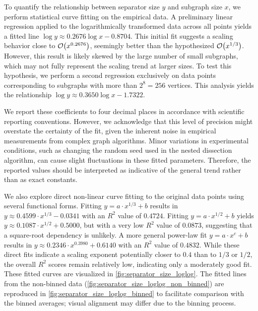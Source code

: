 To quantify the relationship between separator size \( y \) and subgraph size \( x \), we perform statistical curve fitting on the empirical data.
A preliminary linear regression applied to the logarithmically transformed data across all points yields a fitted line \( \log y \approx 0.2676 \log x - 0.8704 \).
This initial fit suggests a scaling behavior close to \( \mathcal{O}\!\left(x^{0.2676}\right) \), seemingly better than the hypothesized \( \mathcal{O}\!\left(x^{1/3}\right) \).
However, this result is likely skewed by the large number of small subgraphs, which may not fully represent the scaling trend at larger sizes.
To test this hypothesis, we perform a second regression exclusively on data points corresponding to subgraphs with more than \( 2^8 = 256 \) vertices.
This analysis yields the relationship \( \log y \approx 0.3650 \log x - 1.7322 \).

We report these coefficients to four decimal places in accordance with scientific reporting conventions.
However, we acknowledge that this level of precision might overstate the certainty of the fit, given the inherent noise in empirical measurements from complex graph algorithms.
Minor variations in experimental conditions, such as changing the random seed used in the nested dissection algorithm, can cause slight fluctuations in these fitted parameters.
Therefore, the reported values should be interpreted as indicative of the general trend rather than as exact constants.

We also explore direct non-linear curve fitting to the original data points using several functional forms.
Fitting \( y = a \cdot x^{1/3} + b \) results in \( y \approx 0.4599 \cdot x^{1/3} - 0.0341 \) with an \( R^2 \) value of \( 0.4724 \).
Fitting \( y = a \cdot x^{1/2} + b \) yields \( y \approx 0.1087 \cdot x^{1/2} + 0.5000 \), but with a very low \( R^2 \) value of \( 0.0873 \), suggesting that a square-root dependency is unlikely.
A more general power-law fit \( y = a \cdot x^c + b \) results in \( y \approx 0.2346 \cdot x^{0.3980} + 0.6140 \) with an \( R^2 \) value of \( 0.4832 \).
While these direct fits indicate a scaling exponent potentially closer to \( 0.4 \) than to \( 1/3 \) or \( 1/2 \), the overall \( R^2 \) scores remain relatively low, indicating only a moderately good fit.
These fitted curves are visualized in \cref{fig:separator_size_loglog}.
The fitted lines from the non-binned data (\cref{fig:separator_size_loglog_non_binned}) are reproduced in \cref{fig:separator_size_loglog_binned} to facilitate comparison with the binned averages; visual alignment may differ due to the binning process.

